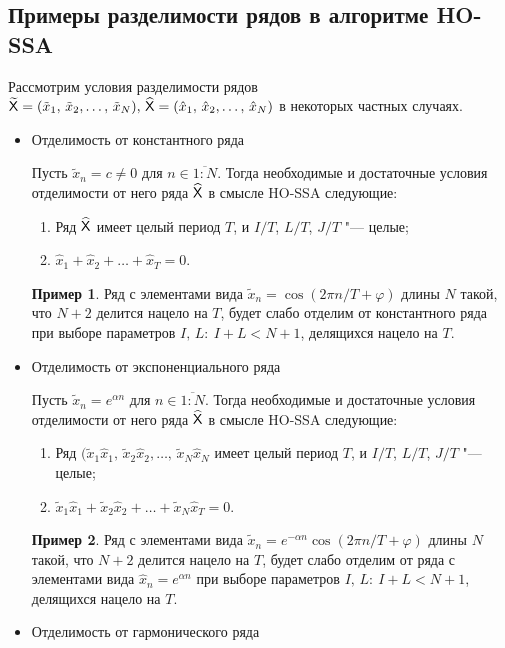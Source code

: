 \documentclass[specialist,
    substylefile = spbu_report.rtx,
    subf,href,colorlinks=true, 12pt]{disser}
\theoremstyle{plain}
\theoremstyle{definition}
\newtheorem{example}{Пример}[section]
\theoremstyle{remark}
\begin{document}
    \subsection{Примеры разделимости рядов в алгоритме HO-SSA}\label{subsec:separation-example}
    Рассмотрим условия разделимости рядов $\widetilde{\mathsf{X}}=(\tilde{x}_{1},\, \tilde{x}_{2},\ldots,\, \tilde{x}_{N}),\, \widehat{\mathsf{X}}=
    (\hat{x}_{1},\, \hat{x}_{2},\ldots,\, \hat{x}_{N})$ в некоторых частных случаях.
    \begin{itemize}
        \item Отделимость от константного ряда

        Пусть $\tilde{x}_n=c\ne 0$ для $n\in\overline{1:N}$.
        Тогда необходимые и достаточные условия отделимости от него ряда $\widehat{\mathsf{X}}$ в смысле HO-SSA следующие:
        \begin{enumerate}
            \item Ряд $\widehat{\mathsf{X}}$ имеет целый период $T$, и $I/T$, $L/T$, $J/T$ "--- целые;
            \item $\hat{x}_{1}+\hat{x}_2+\ldots+\hat{x}_T=0$.
        \end{enumerate}
        \begin{example}
            Ряд с элементами вида $\tilde{x}_n=\cos(2\pi n / T + \varphi)$ длины $N$ такой, что $N+2$ делится нацело на
            $T$, будет слабо отделим от константного ряда при выборе параметров $I,\, L:\: I+L< N+1$, делящихся нацело на $T$.
        \end{example}
        \item Отделимость от экспоненциального ряда

        Пусть $\tilde{x}_n=e^{\alpha n}$ для $n\in\overline{1:N}$.
        Тогда необходимые и достаточные условия отделимости от него ряда $\widehat{\mathsf{X}}$ в смысле HO-SSA следующие:
        \begin{enumerate}
            \item Ряд $(\tilde{x}_{1}\hat{x}_{1},\, \tilde{x}_{2}\hat{x}_{2},\ldots,\, \tilde{x}_{N}\hat{x}_{N}$
            имеет целый период $T$, и $I/T$, $L/T$, $J/T$ "--- целые;
            \item $\tilde{x}_{1}\hat{x}_{1}+\tilde{x}_{2}\hat{x}_2+\ldots+\tilde{x}_{N}\hat{x}_T=0$.
        \end{enumerate}
        \begin{example}
            Ряд с элементами вида $\tilde{x}_n=e^{-\alpha n}\cos(2\pi n / T + \varphi)$ длины $N$ такой, что $N+2$ делится нацело на
            $T$, будет слабо отделим от ряда с элементами вида $\hat{x}_n=e^{\alpha n}$ при выборе параметров $I,\, L:\: I+L< N+1$, делящихся нацело на $T$.
        \end{example}
        \item Отделимость от гармонического ряда


\end{itemize}
\end{document}
